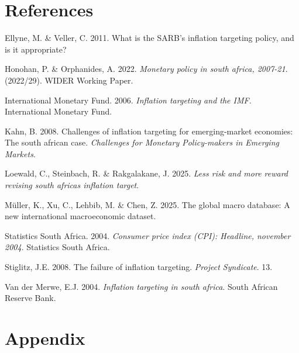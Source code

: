 \documentclass[11pt,preprint]{elsarticle}
\numberwithin{equation}{section}
\numberwithin{figure}{section}
\numberwithin{table}{section}
\newlength{\cslhangindent}
\newenvironment{CSLReferences}[2] %
{\begin{list}{}{%
	\setlength{\itemindent}{0pt}
	\setlength{\leftmargin}{0pt}
	\setlength{\parsep}{0pt}
	\ifodd #1
	\setlength{\leftmargin}{\cslhangindent}
	\setlength{\itemindent}{-1\cslhangindent}
	\fi
	\setlength{\itemsep}{#2\baselineskip}}}
{\end{list}}
\begin{document}
\newpage

\section*{References}\label{references}

\label{refs}
\begin{CSLReferences}{1}{1}
Ellyne, M. \& Veller, C. 2011. What is the SARB's inflation targeting
policy, and is it appropriate?

Honohan, P. \& Orphanides, A. 2022. \emph{Monetary policy in south
africa, 2007-21}. (2022/29). WIDER Working Paper.

International Monetary Fund. 2006. \emph{Inflation targeting and the
{IMF}}. International Monetary Fund.

Kahn, B. 2008. Challenges of inflation targeting for emerging-market
economies: The south african case. \emph{Challenges for Monetary
Policy-makers in Emerging Markets}.

Loewald, C., Steinbach, R. \& Rakgalakane, J. 2025. \emph{Less risk and
more reward revising south africas inflation target}.

Müller, K., Xu, C., Lehbib, M. \& Chen, Z. 2025. The global macro
database: A new international macroeconomic dataset.

Statistics South Africa. 2004. \emph{Consumer price index (CPI):
Headline, november 2004}. Statistics South Africa.

Stiglitz, J.E. 2008. The failure of inflation targeting. \emph{Project
Syndicate}. 13.

Van der Merwe, E.J. 2004. \emph{Inflation targeting in south africa}.
South African Reserve Bank.

\end{CSLReferences}

\newpage

\section*{Appendix}\label{appendix}
\end{document}

